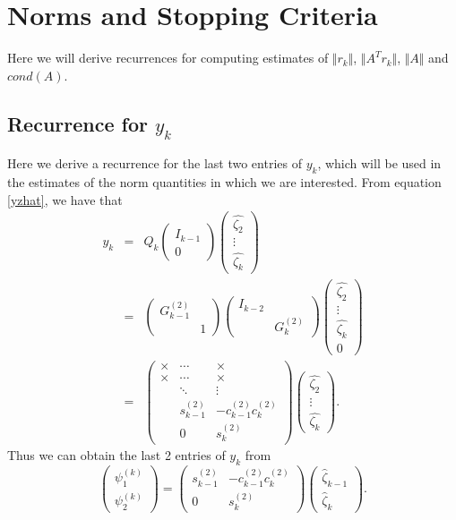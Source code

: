 \documentclass[11pt]{article}
\newcommand{\Ik}{\begin{pmatrix} I_{k-1} \\ 0\end{pmatrix}}
\newcommand{\hQ}{\hat{Q}}
\begin{document}
\section{Norms and Stopping Criteria}
Here we will derive recurrences for computing estimates of $\Vert r_k \Vert$, $\Vert A^T r_k \Vert$, $\Vert A \Vert$ and $cond(A)$.

\subsection{Recurrence for $y_k$}
\label{reccY}
Here we derive a recurrence for the last two entries of $y_k$, which will be used in the estimates of the norm quantities in which we are interested. From equation \ref{yzhat}, we have that
\begin{eqnarray*}
y_k &=& \hQ_k \Ik \begin{pmatrix} \hat{\zeta_2} \\ \vdots \\ \hat{\zeta_k} \end{pmatrix} \\
&=& \begin{pmatrix}
G^{(2)}_{k-1} & \\ & 1
\end{pmatrix}\begin{pmatrix}
I_{k-2} & \\ & G^{(2)}_k
\end{pmatrix} \begin{pmatrix} \hat{\zeta_2} \\ \vdots \\ \hat{\zeta_k} \\ 0 \end{pmatrix} \\
&=& \begin{pmatrix}
\times & \cdots & \times \\
\times & \cdots & \times \\
 & \ddots & \vdots  \\
 & s^{(2)}_{k-1} & -c^{(2)}_{k-1} c^{(2)}_k \\
 & 0 & s^{(2)}_k
\end{pmatrix} \begin{pmatrix} \hat{\zeta_2} \\ \vdots \\ \hat{\zeta_k} \end{pmatrix}.
\end{eqnarray*}
Thus we can obtain the last 2 entries of $y_k$ from
\begin{equation}
\begin{pmatrix}
\psi^{(k)}_1 \\ \psi^{(k)}_2
\end{pmatrix} =
\begin{pmatrix}
 s^{(2)}_{k-1} & -c^{(2)}_{k-1} c^{(2)}_k \\
 0 & s^{(2)}_k
\end{pmatrix} \begin{pmatrix}
\hat{\zeta}_{k-1} \\ \hat{\zeta}_k
\end{pmatrix}.
\end{equation}
\end{document}
